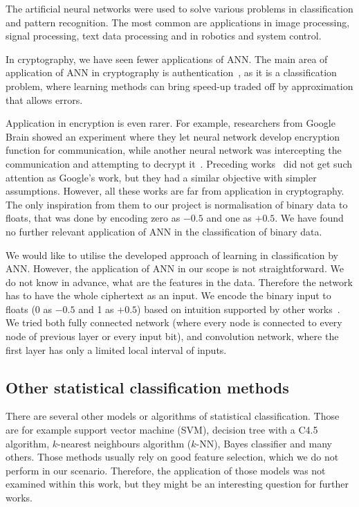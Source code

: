 \documentclass[
  print, %
  Table,   %
  nolof,     %
  nolot,     %
  11pt, %
  oneside  %
]{fithesis3}
\newcommand{\todo}[1]{TODO: \textit{#1}}
\begin{document}
The artificial neural networks were used to solve various problems in classification and pattern recognition. The most common are applications in image processing, signal processing, text data processing and in robotics and system control.

In cryptography, we have seen fewer applications of ANN. The main area of application of ANN in cryptography is authentication~\cite{li2001remote}, as it is a classification problem, where learning methods can bring speed-up traded off by approximation that allows errors.

Application in encryption is even rarer. For example, researchers from Google Brain showed an experiment where they let neural network develop encryption function for communication, while another neural network was intercepting the communication and attempting to decrypt it~\cite{abadi2016learning}. Preceding works~\cite{shihab2006backpropagation, volna2012cryptography} did not get such attention as Google's work, but they had a similar objective with simpler assumptions. However, all these works are far from application in cryptography. The only inspiration from them to our project is normalisation of binary data to floats, that was done by encoding zero as $-0.5$ and one as $+0.5$. We have found no further relevant application of ANN in the classification of binary data.

We would like to utilise the developed approach of learning in classification by ANN. However, the application of ANN in our scope is not straightforward. We do not know in advance, what are the features in the data. Therefore the network has to have the whole ciphertext as an input. We encode the binary input to floats (0 as $-0.5$ and 1 as $+0.5$) based on intuition supported by other works~\cite{abadi2016learning,shihab2006backpropagation}. We tried both fully connected network (where every node is connected to every node of previous layer or every input bit), and convolution network, where the first layer has only a limited local interval of inputs. 


\subsection{Other statistical classification methods}

There are several other models or algorithms of statistical classification. Those are for example support vector machine (SVM), decision tree with a C4.5 algorithm, $k$-nearest neighbours algorithm ($k$-NN), Bayes classifier and many others. Those methods usually rely on good feature selection, which we do not perform in our scenario. Therefore, the application of those models was not examined within this work, but they might be an interesting question for further works.
\end{document}
